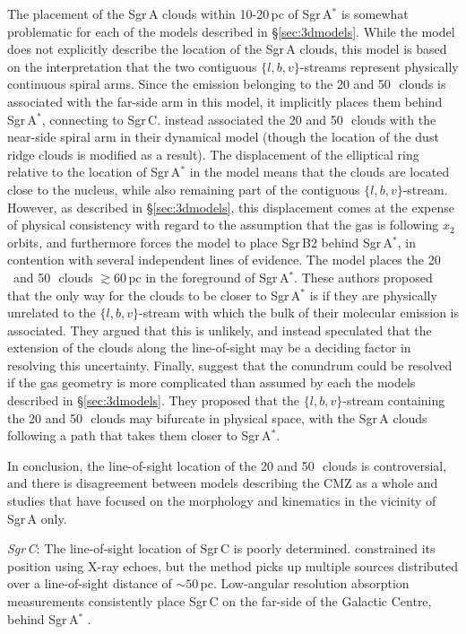The placement of the Sgr\,A clouds within 10-20\,pc of Sgr\,A$^{*}$ is somewhat problematic for each of the models described in \S\ref{sec:3dmodels}. 
While the \citet{Sofue1995a} model does not explicitly describe the location of the Sgr\,A clouds, this model is based on the interpretation that the two contiguous $\{l,b,v\}$-streams represent physically continuous spiral arms. 
Since the emission belonging to the 20 and 50\,\kms \ clouds is associated with the far-side arm in this model, it implicitly places them behind Sgr\,A$^{*}$, connecting to Sgr\,C.
\citet{Ridley2017} instead associated the 20 and 50\,\kms \ clouds with the near-side spiral arm in their dynamical model (though the location of the dust ridge clouds is modified as a result). 
The displacement of the elliptical ring relative to the location of Sgr\,A$^{*}$ in the \citet{Molinari2011} model means that the clouds are located close to the nucleus, while also remaining part of the contiguous $\{l,b,v\}$-stream. 
However, as described in \S\ref{sec:3dmodels}, this displacement comes at the expense of physical consistency with regard to the assumption that the gas is following $x_2$ orbits, and furthermore forces the model to place Sgr\,B2 behind Sgr\,A$^{*}$, in contention with several independent lines of evidence.
The \citet{Kruijssen2015} model places the 20\,\kms \ and 50\,\kms \ clouds $\gtrsim60$\,pc in the foreground of Sgr\,A$^{*}$.
These authors proposed that the only way for the clouds to be closer to Sgr\,A$^{*}$ is if they are physically unrelated to the $\{l,b,v\}$-stream with which the bulk of their molecular emission is associated.
They argued that this is unlikely, and instead speculated that the extension of the clouds along the line-of-sight may be a deciding factor in resolving this uncertainty. 
Finally, \citet{Tress2020} suggest that the conundrum could be resolved if the gas geometry is more complicated than assumed by each the models described in \S\ref{sec:3dmodels}.
They proposed that the $\{l,b,v\}$-stream containing the 20 and 50\,\kms \ clouds may bifurcate in physical space, with the Sgr\,A clouds following a path that takes them closer to Sgr\,A$^{*}$.

In conclusion, the line-of-sight location of the 20 and 50\,\kms \ clouds is controversial, and there is disagreement between models describing the CMZ as a whole and studies that have focused on the morphology and kinematics in the vicinity of Sgr\,A only.  
\medskip 

\noindent\emph{Sgr\,C}: The line-of-sight location of Sgr\,C is poorly determined. \citet{Chuard2018} constrained its position using X-ray echoes, but the method picks up multiple sources distributed over a line-of-sight distance of $\sim50$\,pc. 
Low-angular resolution absorption measurements consistently place Sgr\,C on the far-side of the Galactic Centre, behind Sgr\,A$^{*}$ \citep{Sawada2004, Yan2017}. 

